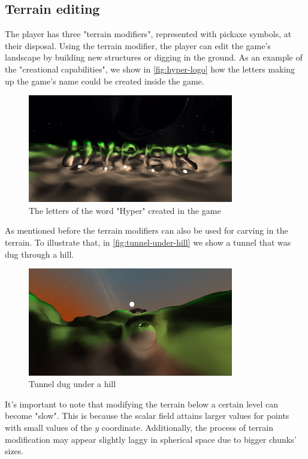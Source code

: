\subsection{Terrain editing}
The player has three "terrain modifiers", represented with pickaxe symbols, at their disposal.
Using the terrain modifier, the player can edit the game's landscape by building new structures or digging in the ground.
As an example of the "creational capabilities", we show in \autoref{fig:hyper-logo} how the letters making up the game's name could be created inside the game.
\begin{figure}[h]
    \centering
    \includegraphics[width=0.8\textwidth]{chapters/results/sections/gameplay/resources/hyper-logo-night-2.png}
    \caption{The letters of the word "Hyper" created in the game}
    \label{fig:hyper-logo}
\end{figure}

As mentioned before the terrain modifiers can also be used for carving in the terrain.
To illustrate that, in \autoref{fig:tunnel-under-hill} we show a tunnel that was dug through a hill.
\begin{figure}[h]
    \centering
    \includegraphics[width=0.8\textwidth]{chapters/results/sections/gameplay/resources/tunnel-with-car.png}
    \caption{Tunnel dug under a hill}
    \label{fig:tunnel-under-hill}
\end{figure}

It's important to note that modifying the terrain below a certain level can become "slow".
This is because the scalar field attains larger values for points with small values of the $y$ coordinate.
Additionally, the process of terrain modification may appear slightly laggy in spherical space due to bigger chunks' sizes.

